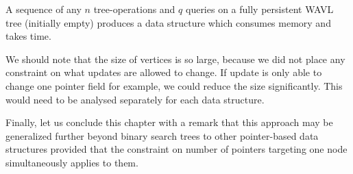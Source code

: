 \begin{cor}
A sequence of any $n$ tree-operations and $q$ queries on a fully persistent WAVL tree (initially empty) produces a data structure which consumes  memory and takes  time.
\end{cor}

We should note that the size of vertices is so large, because we did not place any constraint on what updates are allowed to change. If update is only able to change one pointer field for example, we could reduce the size significantly. This would need to be analysed separately for each data structure.


Finally, let us conclude this chapter with a remark that this approach may be generalized further beyond binary search trees to other pointer-based data structures provided that the constraint on number of pointers targeting one node simultaneously applies to them.
